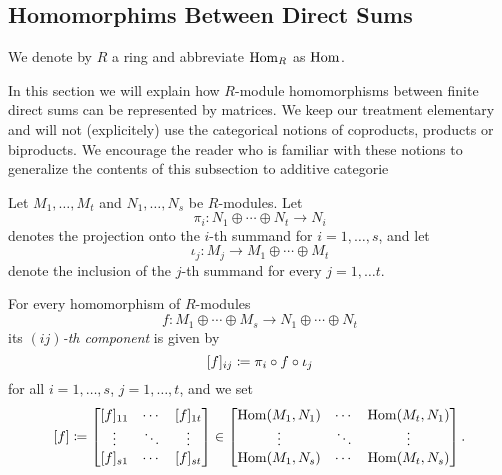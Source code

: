 \subsection{Homomorphims Between Direct Sums}
\label{appendix: homomorphisms between direct sums}


\begin{conventions}
  We denote by $R$ a ring and abbreviate $\operatorname{Hom}_R$ as $\operatorname{Hom}$.
\end{conventions}


\begin{fluff}
  In this section we will explain how $R$-module homomorphisms between finite direct sums can be represented  by matrices.
  We keep our treatment elementary and will not (explicitely) use the categorical notions of coproducts, products or biproducts.
  We encourage the reader who is familiar with these notions to generalize the contents of this subsection to additive categorie
\end{fluff}


\begin{fluff}
  Let $M_1, \dotsc, M_t$ and $N_1, \dotsc, N_s$ be $R$-modules.
  Let
  \[
          \pi_i
  \colon  N_1 \oplus \dotsb \oplus N_t
  \to     N_i
  \]
  denotes the projection onto the $i$-th summand for $i = 1, \dotsc, s$, and let
  \[
            \iota_j
    \colon  M_j
    \to     M_1 \oplus \dotsb \oplus M_t
  \]
  denote the inclusion of the $j$-th summand for every $j = 1, \dotsc t$.
\end{fluff}


\begin{definition}
  For every homomorphism of $R$-modules
  \[
            f
    \colon  M_1 \oplus \dotsb \oplus M_s
    \to     N_1 \oplus \dotsb \oplus N_t
  \]
  its \emph{$(ij)$-th component} is given by
  \[
              [f]_{ij}
    \coloneqq  \pi_i \circ f \circ \iota_j
  \]
  for all $i = 1, \dotsc, s$, $j = 1, \dotsc, t$, and we set
  \[
              [f]
    \coloneqq  \begin{bmatrix}
                [f]_{11}  & \cdots  & [f]_{1t}  \\
                \vdots    & \ddots  & \vdots    \\
                [f]_{s1}  & \cdots  & [f]_{st}
              \end{bmatrix}
    \in       \begin{bmatrix}
                \operatorname{Hom}(M_1, N_1)  & \cdots  & \operatorname{Hom}(M_t, N_1)  \\
                \vdots          & \ddots  & \vdots          \\
                \operatorname{Hom}(M_1, N_s)  & \cdots  & \operatorname{Hom}(M_t, N_s)
              \end{bmatrix}.
  \]
\end{definition}


